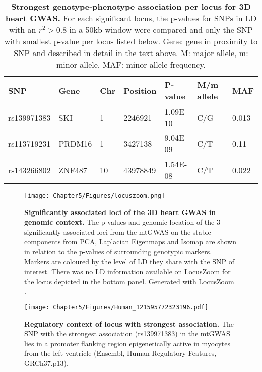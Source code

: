 \begin{table}[htbp]
  \centering
  \caption[\textbf{Strongest genotype-phenotype association per locus for 3D heart GWAS. }]{\textbf{Strongest genotype-phenotype association per locus for 3D heart GWAS. } For each significant locus, the p-values for SNPs in LD with an \(r^2 > 0.8\) in a \num{50}kb window were compared and only the SNP with smallest p-value per locus listed below. Gene: gene in proximity to SNP and described in detail in the text above. M: major allele, m:  minor allele, MAF: minor allele frequency. }
  \begin{small}
    \begin{tabular}{lllllll}
    \toprule
    SNP   & Gene & Chr   & Position & P-value &  M/m allele & MAF \\
    \midrule
    rs139971383 & SKI & \num{1} & \num{2246921} & \num{1.09E-10} & C/G     & \num{0.013} \\
    rs113719231 & PRDM16 & \num{1} & \num{3427138} & \num{9.04E-09} & C/T     & \num{0.11} \\
    rs143266802 & ZNF487 & \num{10} & \num{43978849} & \num{1.54E-08} & C/T     & \num{0.022} \\
    \bottomrule
    \end{tabular}%
    \end{small}
  \label{tab:gwas-heart}%
\end{table}%
%
\begin{figure}[hbtp]
	\centering
	\texttt{[image: Chapter5/Figures/locuszoom.png]}
	\caption[\textbf{Significantly associated loci of the 3D heart GWAS in genomic context. }]{\textbf{Significantly associated loci of the 3D heart GWAS in genomic context. }The p-values and genomic location of the \num{3} significantly associated loci from the mtGWAS on the stable components from PCA, Laplacian Eigenmaps and Isomap are shown in relation to the p-values of surrounding genotypic markers. Markers are coloured by the level of LD they share with the SNP of interest. There was no LD information available on LocusZoom for the locus depicted in the bottom panel. Generated with LocusZoom \citep{Pruim2010}.}  
	 	\label{fig:locuszoom-heart}
\end{figure}
%
\begin{figure}[hbtp]
	\centering
	\texttt{[image: Chapter5/Figures/Human\_121595772323196.pdf]}
	\caption[\textbf{Regulatory context of locus with strongest association. }]{\textbf{Regulatory context of locus with strongest association. } The SNP with the strongest association (rs139971383) in the mtGWAS lies in a promoter flanking region epigenetically active in myocytes from the left ventricle (Ensembl, Human Regulatory Features, GRCh37.p13). } 
	 	\label{fig:regulatory-heart}
\end{figure}
